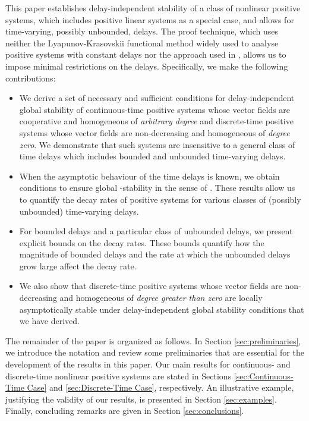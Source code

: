 \documentclass[11pt,draftclsnofoot,onecolumn]{IEEEtran}
\begin{document}
This paper establishes delay-independent stability of a class of nonlinear positive systems, which includes positive linear systems as a special case, and allows for time-varying, possibly unbounded, delays. The proof technique, which uses neither the Lyapunov-Krasovskii functional method widely used to analyse positive systems with constant delays \cite{Haddad:04} nor the approach used in \cite{Mason:09,Vahid:10}, allows us to impose minimal restrictions on the delays. Specifically, we make the following contributions:
\begin{itemize}
\item We derive a set of necessary and sufficient conditions for delay-independent global stability of  continuous-time positive systems whose vector fields are cooperative and homogeneous of {\em arbitrary degree} and  discrete-time positive systems whose vector fields are non-decreasing and homogeneous of {\em degree zero}. We demonstrate that such systems are insensitive to a general class of time delays which includes bounded and unbounded time-varying delays.
\item When the asymptotic behaviour of the time delays is known, we obtain conditions to ensure global -stability in the sense of \cite{Chen:07,LLiu:08,LLiu:10}. These results allow us to quantify the decay rates of positive systems for various classes of (possibly unbounded) time-varying delays.
\item For bounded delays and a particular class of unbounded delays, we present explicit bounds on the decay rates. These bounds quantify how the magnitude of bounded delays and the rate at which the unbounded delays grow large affect the decay rate.
\item We also show that discrete-time positive systems whose vector fields are non-decreasing and homogeneous of {\em degree greater than zero} are locally asymptotically stable under delay-independent global stability conditions that we have derived.
\end{itemize}

The remainder of the paper is organized as follows. In Section \ref{sec:preliminaries}, we introduce the notation and review some preliminaries that are essential for the development of the results in this paper. Our main results for continuous- and discrete-time nonlinear positive systems are stated in Sections \ref{sec:Continuous-Time Case} and \ref{sec:Discrete-Time Case}, respectively. An illustrative example, justifying the validity of our results, is presented in Section \ref{sec:examples}. Finally, concluding remarks are given in Section \ref{sec:conclusions}.
\end{document}
